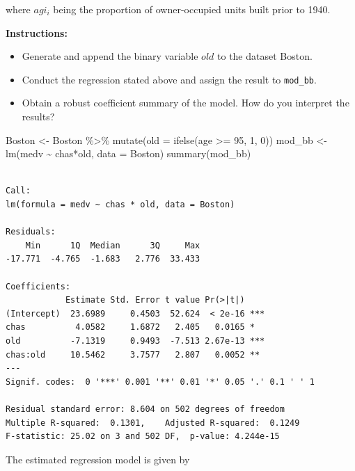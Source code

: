 \documentclass[
  12pt,
  letterpaper,
]{scrbook}
\newenvironment{Shaded}{\begin{snugshade}}{\end{snugshade}}
\newcommand{\AttributeTok}[1]{\textcolor[rgb]{0.40,0.45,0.13}{#1}}
\newcommand{\DecValTok}[1]{\textcolor[rgb]{0.68,0.00,0.00}{#1}}
\newcommand{\FunctionTok}[1]{\textcolor[rgb]{0.28,0.35,0.67}{#1}}
\newcommand{\NormalTok}[1]{\textcolor[rgb]{0.00,0.23,0.31}{#1}}
\newcommand{\OtherTok}[1]{\textcolor[rgb]{0.00,0.23,0.31}{#1}}
\newcommand{\SpecialCharTok}[1]{\textcolor[rgb]{0.37,0.37,0.37}{#1}}
\providecommand{\tightlist}{%
  \setlength{\itemsep}{0pt}\setlength{\parskip}{0pt}}
\renewcommand{\tightlist}{\setlength{\itemsep}{0.5\baselineskip}\setlength{\parskip}{0.2\baselineskip}}
\theoremstyle{definition}
\theoremstyle{plain}
\theoremstyle{remark}
\begin{document}
where \(agi_i\) being the proportion of owner-occupied units built prior
to 1940.

\textbf{Instructions:}

\begin{itemize}
\tightlist
\item
  Generate and append the binary variable \(old\) to the dataset Boston.
\item
  Conduct the regression stated above and assign the result to
  \texttt{mod\_bb}.
\item
  Obtain a robust coefficient summary of the model. How do you interpret
  the results?
\end{itemize}

\begin{Shaded}
\begin{Highlighting}[]
\NormalTok{Boston }\OtherTok{\textless{}{-}}\NormalTok{ Boston }\SpecialCharTok{\%\textgreater{}\%}
    \FunctionTok{mutate}\NormalTok{(}\AttributeTok{old =} \FunctionTok{ifelse}\NormalTok{(age }\SpecialCharTok{\textgreater{}=} \DecValTok{95}\NormalTok{, }\DecValTok{1}\NormalTok{, }\DecValTok{0}\NormalTok{))}
\NormalTok{mod\_bb }\OtherTok{\textless{}{-}} \FunctionTok{lm}\NormalTok{(medv }\SpecialCharTok{\textasciitilde{}}\NormalTok{ chas}\SpecialCharTok{*}\NormalTok{old, }\AttributeTok{data =}\NormalTok{ Boston)}
\FunctionTok{summary}\NormalTok{(mod\_bb)}
\end{Highlighting}
\end{Shaded}

\begin{verbatim}

Call:
lm(formula = medv ~ chas * old, data = Boston)

Residuals:
    Min      1Q  Median      3Q     Max 
-17.771  -4.765  -1.683   2.776  33.433 

Coefficients:
            Estimate Std. Error t value Pr(>|t|)    
(Intercept)  23.6989     0.4503  52.624  < 2e-16 ***
chas          4.0582     1.6872   2.405   0.0165 *  
old          -7.1319     0.9493  -7.513 2.67e-13 ***
chas:old     10.5462     3.7577   2.807   0.0052 ** 
---
Signif. codes:  0 '***' 0.001 '**' 0.01 '*' 0.05 '.' 0.1 ' ' 1

Residual standard error: 8.604 on 502 degrees of freedom
Multiple R-squared:  0.1301,    Adjusted R-squared:  0.1249 
F-statistic: 25.02 on 3 and 502 DF,  p-value: 4.244e-15
\end{verbatim}

The estimated regression model is given by
\end{document}
